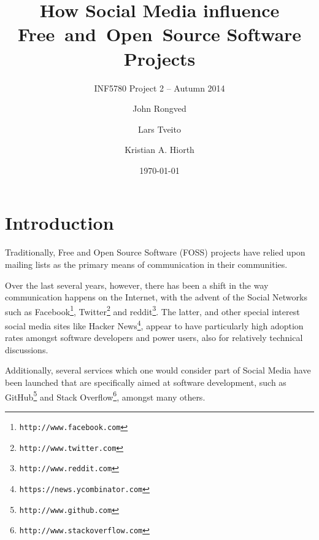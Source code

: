 \documentclass[a4paper,11pt]{article} %
\title{How Social Media influence \hbox{Free and Open Source} Software Projects}
\subtitle{INF5780 Project 2 -- Autumn 2014}
\date{\today}
\author{John Rongved \and Lars Tveito \and Kristian A. Hiorth}
\begin{document}
\ififorside{}

\tableofcontents{}
\newpage

\section{Introduction}

Traditionally, Free and Open Source Software (FOSS) projects have
relied upon mailing lists as the primary means of communication in
their communities. %

Over the last several years, however, there has been a shift in the way
communication happens on the Internet, with the advent of the Social
Networks such as Facebook\footnote{\texttt{http://www.facebook.com}}, Twitter\footnote{\texttt{http://www.twitter.com}} and reddit\footnote{\texttt{http://www.reddit.com}}.
The latter, and other special
interest social media sites like Hacker News\footnote{\texttt{https://news.ycombinator.com}}, appear to have particularly
high adoption rates amongst software developers and power users, also for
relatively technical discussions.

Additionally, several services which one would consider part of Social Media
have been launched that are specifically aimed at software development, such
as GitHub\footnote{\texttt{http://www.github.com}} and Stack Overflow\footnote{\texttt{http://www.stackoverflow.com}}, amongst many others.

\end{document}

